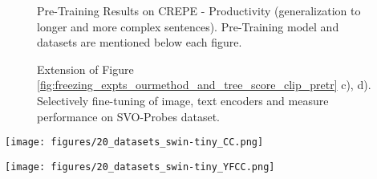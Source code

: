 \documentclass[11pt]{article}
\newcommand{\methodcomp}{MosaiCLIP}
\newcommand{\clip}{CLIP}
\newcommand{\negclip}{NegCLIP}
\begin{document}
\begin{figure}[h!]
    \centering
    \hfill
    \hfill
    \hfill
    \caption{Pre-Training Results on {\color{blue} CREPE - Productivity} (generalization to longer and more complex sentences). Pre-Training model and datasets are mentioned below each figure.}
    \label{fig:Productivity_clip_pretr}
\end{figure}

\begin{figure}[h!]
    \centering
    \centering
    \caption{Extension of Figure \ref{fig:freezing_expts_ourmethod_and_tree_score_clip_pretr} c), d). Selectively fine-tuning of image, text encoders and measure performance on {\color{blue} SVO-Probes} dataset.}
    \label{fig:freezing_expts__SVO}
\end{figure}

\begin{figure*}[h!]
    \centering
    \texttt{[image: figures/20\_datasets\_swin-tiny\_CC.png]}
    \caption{Comparing of \clip{}, \negclip{} and \methodcomp{} on 20 datasets of from the {\color{blue} ELEVATER} \citep{li2022elevater} benchmark. Models in this graph are pretrained with CC-12M data and have Swin-Tiny as the vision backbone. See Sec. \ref{results} for more details.}
    \label{fig:20_datasets_swin_CC}
\end{figure*}

\begin{figure*}[ht]
  \centering
  \texttt{[image: figures/20\_datasets\_swin-tiny\_YFCC.png]}
  \caption{Comparing of \clip{}, \negclip{} and \methodcomp{} on 20 datasets of from the {\color{blue} ELEVATER} \citep{li2022elevater} benchmark. Models in this graph are pretrained with YFCC-15M data and have Swin-Tiny as the vision backbone. See Sec. \ref{results} for more details.}
  \label{fig:20_datasets_swin_YFCC}
\end{figure*}
\end{document}
